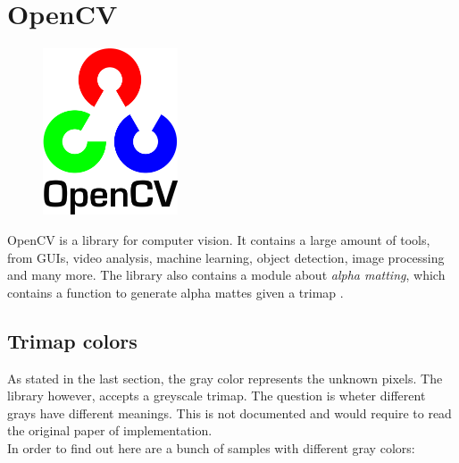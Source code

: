 \documentclass[a4paper]{article}
\begin{document}
\pagebreak

\section{OpenCV}

\begin{figure}
    \includegraphics[width=4cm]{opencvlogo.png}
\end{figure}

OpenCV\cite{opencv} is a library
for computer vision. It contains a large
amount of tools, from GUIs, video analysis, machine learning,
object detection, image processing and many more\cite{opencvdoc}.
The library also contains a module about \textit{alpha matting},
which contains a function to generate alpha mattes given a trimap
\cite{opencvalphamatting}.

\subsection{Trimap colors}

As stated in the last section, the gray color represents the unknown pixels.
The library however, accepts a greyscale trimap.
The question is wheter different grays have different meanings.
This is not documented and would require to read the original
paper of implementation. \\ %
In order to find out here are a bunch of samples with different gray
colors:

\wrapfill
\end{document}
